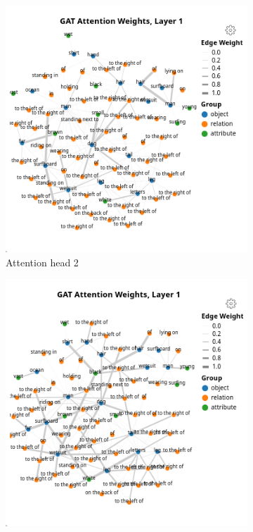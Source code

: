 \begin{figure}[htbp]
\begin{subfigure}[r]{0.49\textwidth}
        \includegraphics[width=\textwidth]{figures/positive_logical/positive_logical_gat_l1_h1.png}
        \caption{Attention head 2}
    \end{subfigure}
    \begin{subfigure}[l]{0.49\textwidth}
        \includegraphics[width=\textwidth]{figures/positive_logical/positive_logical_gat_l1_h2.png}

\end{subfigure}
\end{figure}
